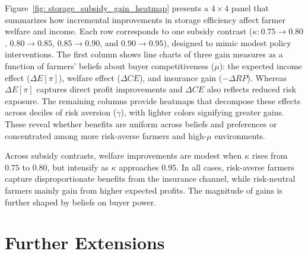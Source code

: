 Figure~\ref{fig: storage_subsidy_gain_heatmap} presents a $4 \times 4$ panel that summarizes how incremental improvements in storage efficiency affect farmer welfare and income. Each row corresponds to one subsidy contrast ($\kappa: 0.75 \rightarrow 0.80$, $0.80 \rightarrow 0.85$, $0.85 \rightarrow 0.90$, and $0.90 \rightarrow 0.95$), designed to mimic modest policy interventions. The first column shows line charts of three gain measures as a function of farmers’ beliefs about buyer competitiveness ($\mu$): the expected income effect ($\Delta E[\pi]$), welfare effect ($\Delta CE$), and insurance gain ($-\Delta RP$). Whereas $\Delta E[\pi]$ captures direct profit improvements and $\Delta CE$ also reflects reduced risk exposure. The remaining columns provide heatmaps that decompose these effects across deciles of risk aversion ($\gamma$), with lighter colors signifying greater gains. These reveal whether benefits are uniform across beliefs and preferences or concentrated among more risk-averse farmers and high-$\mu$ environments.

Across subsidy contrasts, welfare improvements are modest when $\kappa$ rises from $0.75$ to $0.80$, but intensify as $\kappa$ approaches $0.95$. In all cases, risk-averse farmers capture disproportionate benefits from the insurance channel, while risk-neutral farmers mainly gain from higher expected profits. The magnitude of gains is further shaped by beliefs on buyer power. 



\section{Further Extensions}

